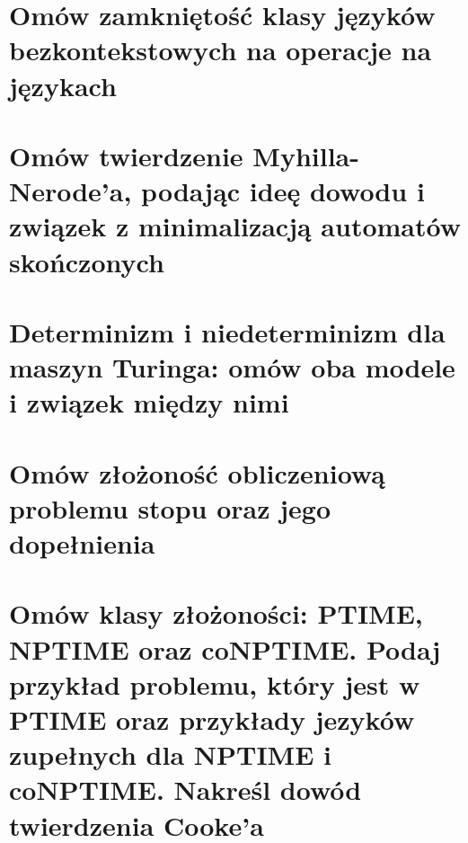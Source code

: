 \section{Omów zamkniętość klasy języków bezkontekstowych na operacje na językach}


\section{Omów twierdzenie Myhilla-Nerode'a, podając ideę dowodu i związek z minimalizacją automatów skończonych}


\section{Determinizm i niedeterminizm dla maszyn Turinga: omów oba modele i związek między nimi}


\section{Omów złożoność obliczeniową problemu stopu oraz jego dopełnienia}


\section{Omów klasy złożoności: PTIME, NPTIME oraz coNPTIME. Podaj przykład problemu, który jest w PTIME oraz przykłady jezyków zupełnych dla NPTIME i coNPTIME. Nakreśl dowód twierdzenia Cooke'a}
